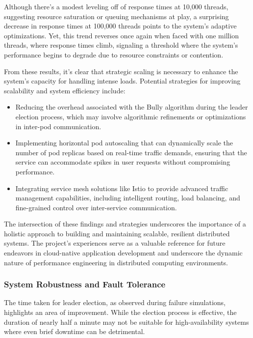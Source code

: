 \documentclass{article}
\begin{document}
      Although there's a modest leveling off of response times at 10,000 threads, suggesting resource saturation or queuing mechanisms at play, a surprising decrease in response times at 100,000 threads points to the system's adaptive optimizations. Yet, this trend reverses once again when faced with one million threads, where response times climb, signaling a threshold where the system's performance begins to degrade due to resource constraints or contention.
      
      From these results, it's clear that strategic scaling is necessary to enhance the system's capacity for handling intense loads. Potential strategies for improving scalability and system efficiency include:
      
      \begin{itemize}
        \item Reducing the overhead associated with the Bully algorithm during the leader election process, which may involve algorithmic refinements or optimizations in inter-pod communication.
        \item Implementing horizontal pod autoscaling that can dynamically scale the number of pod replicas based on real-time traffic demands, ensuring that the service can accommodate spikes in user requests without compromising performance.
        \item Integrating service mesh solutions like Istio\cite{istio} to provide advanced traffic management capabilities, including intelligent routing, load balancing, and fine-grained control over inter-service communication.
      \end{itemize}
      
      The intersection of these findings and strategies underscores the importance of a holistic approach to building and maintaining scalable, resilient distributed systems. The project's experiences serve as a valuable reference for future endeavors in cloud-native application development and underscore the dynamic nature of performance engineering in distributed computing environments.
  
      \subsubsection*{System Robustness and Fault Tolerance}
      The time taken for leader election, as observed during failure simulations, highlights an area of improvement. While the election process is effective, the duration of nearly half a minute may not be suitable for high-availability systems where even brief downtime can be detrimental. 
\end{document}
